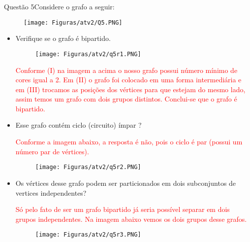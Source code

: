 \documentclass[12pt]{article}
\begin{document}
\begin{section}{Questão 5}{Considere o grafo a seguir:}

 \begin{figure}[H]
    \centering
    \texttt{[image: Figuras/atv2/Q5.PNG]}
\end{figure}

\begin{itemize}
    \item[(a)] Verifique se o grafo é bipartido.
    
 \begin{figure}[H]
    \centering
    \texttt{[image: Figuras/atv2/q5r1.PNG]}
\end{figure}

\noindent \textcolor{red}{Conforme (I) na imagem a acima o nosso grafo possui número mínimo de cores igual a 2. Em (II) o grafo foi colocado em uma forma intermediária e em (III) trocamos as posições dos vértices para que estejam do mesmo lado, assim temos um grafo com dois grupos distintos. Conclui-se que o grafo é bipartido.}
    
    \item[(b)] Esse grafo contém ciclo (circuito) ímpar ?

\noindent \textcolor{red}{Conforme a imagem abaixo, a resposta é não, pois o ciclo é par (possui um número par de vértices).}
    
 \begin{figure}[H]
    \centering
    \texttt{[image: Figuras/atv2/q5r2.PNG]}
\end{figure}

    
    \item[(c)] Os vértices desse grafo podem ser particionados em dois subconjuntos de vertices independentes?

\noindent \textcolor{red}{Só pelo fato de ser um grafo bipartido já seria possível separar em dois grupos independentes. Na imagem abaixo vemos os dois grupos desse grafos.}


 \begin{figure}[H]
    \centering
    \texttt{[image: Figuras/atv2/q5r3.PNG]}
\end{figure}

\end{itemize}


\end{section}
\newpage
\end{document}
